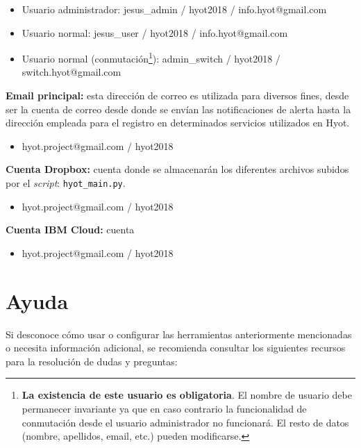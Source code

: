 \documentclass[12pt,a4paper, twoside]{report}
\begin{document}
	\begin{itemize}
		\item Usuario administrador: jesus\_admin / hyot2018 / {\color{red}info.hyot@gmail.com}
		\item Usuario normal: jesus\_user / hyot2018 / {\color{red}info.hyot@gmail.com}
		\item Usuario normal (conmutación\footnote{\textbf{La existencia de este usuario es obligatoria}. El nombre de usuario debe permanecer invariante ya que en caso contrario la funcionalidad de conmutación desde el usuario administrador no funcionará. El resto de datos (nombre, apellidos, email, etc.) pueden modificarse.}): admin\_switch / hyot2018 / {\color{red}switch.hyot@gmail.com}
	\end{itemize}
	
	\textbf{Email principal:} esta dirección de correo es utilizada para diversos fines, desde ser la cuenta de correo desde donde se envían las notificaciones de alerta hasta la dirección empleada para el registro en determinados servicios utilizados en Hyot.

	\begin{itemize}
		\item hyot.project@gmail.com / hyot2018
	\end{itemize}
	
	\textbf{Cuenta Dropbox:} cuenta donde se almacenarán los diferentes archivos subidos por el \textit{\gls{script}}: \texttt{hyot\_main.py}.

	\begin{itemize}
		\item hyot.project@gmail.com / hyot2018
	\end{itemize}
	
	\textbf{Cuenta IBM Cloud:} cuenta 

	\begin{itemize}
		\item {\color{red}hyot.project@gmail.com / hyot2018} 
	\end{itemize}
	
	\section{Ayuda}
	
	Si desconoce cómo usar o configurar las herramientas anteriormente mencionadas o necesita información adicional, se recomienda consultar los siguientes recursos para la resolución de dudas y preguntas:
	
\end{document}
